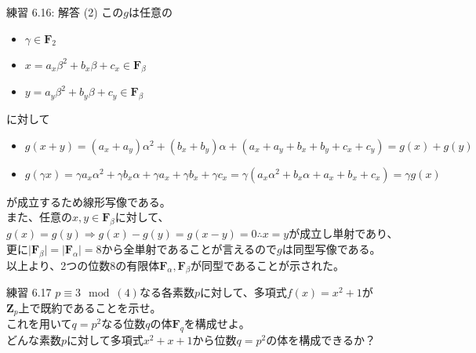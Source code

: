 \documentclass[dvipdfmx,10pt,jsarticle]{beamer}
\begin{document}
  \begin{frame}{練習 6.16: 解答 (2)}
    この$g$は任意の
    \begin{itemize}
      \item $\gamma \in \mathbf{F}_2$
      \item $x = a_x \beta^2 + b_x \beta + c_x \in \mathbf{F}_\beta$
      \item $y = a_y \beta^2 + b_y \beta + c_y \in \mathbf{F}_\beta$
    \end{itemize}
    に対して
    \begin{itemize}
      \item $ g(x + y) = (a_x + a_y) \alpha^2 + (b_x + b_y) \alpha + (a_x + a_y + b_x + b_y + c_x + c_y) = g(x) + g(y) $
      \item $ g(\gamma x) = \gamma a_x \alpha^2 + \gamma b_x \alpha + \gamma a_x + \gamma b_x + \gamma c_x = \gamma(a_x \alpha^2 + b_x \alpha + a_x + b_x + c_x) = \gamma g(x) $
    \end{itemize}
    が成立するため線形写像である。\\
    また、任意の$x,y \in \mathbf{F}_\beta$に対して、$g(x) = g(y) \Rightarrow g(x) - g(y) = g(x - y) = 0 \therefore x = y$が成立し単射であり、\\
    更に$\mid \mathbf{F}_\beta \mid = \mid \mathbf{F}_\alpha \mid = 8$から全単射であることが言えるので$g$は同型写像である。 \\
    以上より、2つの位数8の有限体$\mathbf{F}_\alpha, \mathbf{F}_\beta$が同型であることが示された。

  \end{frame}

  \begin{frame}{練習 6.17}
    $p \equiv 3 \mod (4)$なる各素数$p$に対して、多項式$f(x) = x^2 + 1$が\\ $\mathbf{Z}_p$上で既約であることを示せ。\\
    これを用いて$q = p^2$なる位数$q$の体$\mathbf{F}_q$を構成せよ。\\
    どんな素数$p$に対して多項式$x^2 + x + 1$から位数$q = p^2$の体を構成できるか？
  \end{frame}
\end{document}
